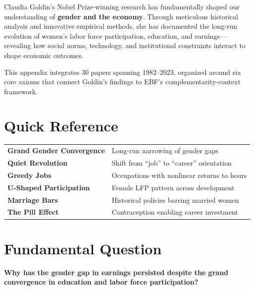 Claudia Goldin's Nobel Prize-winning research has fundamentally shaped our
understanding of \textbf{gender and the economy}. Through meticulous historical
analysis and innovative empirical methods, she has documented the long-run
evolution of women's labor force participation, education, and earnings---revealing
how social norms, technology, and institutional constraints interact to shape
economic outcomes.

This appendix integrates 30 papers spanning 1982--2023, organized around six
core axioms that connect Goldin's findings to EBF's complementarity-context
framework.

\section{Quick Reference}

\begin{tcolorbox}[colback=yellow!5!white, colframe=yellow!75!black, title=Key Concepts]
\begin{tabular}{@{}ll@{}}
\textbf{Grand Gender Convergence} & Long-run narrowing of gender gaps \\
\textbf{Quiet Revolution} & Shift from ``job'' to ``career'' orientation \\
\textbf{Greedy Jobs} & Occupations with nonlinear returns to hours \\
\textbf{U-Shaped Participation} & Female LFP pattern across development \\
\textbf{Marriage Bars} & Historical policies barring married women \\
\textbf{The Pill Effect} & Contraception enabling career investment \\
\end{tabular}
\end{tcolorbox}

\section{Fundamental Question}

\begin{tcolorbox}[colback=red!5!white, colframe=red!75!black,
    title=The Goldin Question]
\centering\Large
\textbf{Why has the gender gap in earnings persisted despite the grand
convergence in education and labor force participation?}
\end{tcolorbox}

